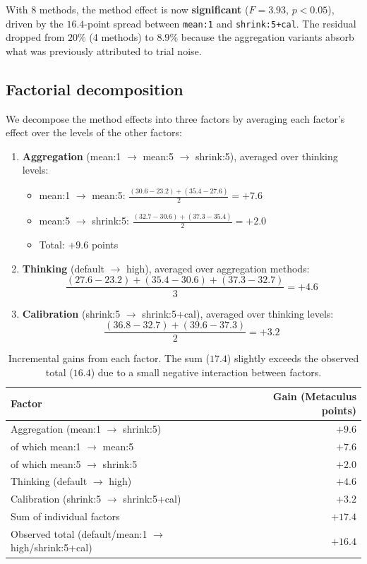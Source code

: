 \documentclass[11pt]{article}
\begin{document}
With 8 methods, the method effect is now \textbf{significant} ($F = 3.93$,
$p < 0.05$), driven by the $16.4$-point spread between \texttt{mean:1}
and \texttt{shrink:5+cal}.  The residual dropped from $20\%$ (4 methods)
to $8.9\%$ because the aggregation variants absorb what was previously
attributed to trial noise.

\subsection{Factorial decomposition}

We decompose the method effects into three factors by averaging each
factor's effect over the levels of the other factors:

\begin{enumerate}
  \item \textbf{Aggregation} (mean:1 $\to$ mean:5 $\to$ shrink:5),
    averaged over thinking levels:
    \begin{itemize}
      \item mean:1 $\to$ mean:5:
        $\frac{(30.6 - 23.2) + (35.4 - 27.6)}{2} = +7.6$
      \item mean:5 $\to$ shrink:5:
        $\frac{(32.7 - 30.6) + (37.3 - 35.4)}{2} = +2.0$
      \item Total: $+9.6$ points
    \end{itemize}
  \item \textbf{Thinking} (default $\to$ high),
    averaged over aggregation methods:
    \[
      \frac{(27.6 - 23.2) + (35.4 - 30.6) + (37.3 - 32.7)}{3} = +4.6
    \]
  \item \textbf{Calibration} (shrink:5 $\to$ shrink:5+cal),
    averaged over thinking levels:
    \[
      \frac{(36.8 - 32.7) + (39.6 - 37.3)}{2} = +3.2
    \]
\end{enumerate}

\begin{table}[h]
\centering
\begin{tabular}{lr}
\toprule
Factor & Gain (Metaculus points) \\
\midrule
Aggregation (mean:1 $\to$ shrink:5) & $+9.6$ \\
\quad of which mean:1 $\to$ mean:5 & $+7.6$ \\
\quad of which mean:5 $\to$ shrink:5 & $+2.0$ \\
Thinking (default $\to$ high) & $+4.6$ \\
Calibration (shrink:5 $\to$ shrink:5+cal) & $+3.2$ \\
\midrule
Sum of individual factors & $+17.4$ \\
Observed total (default/mean:1 $\to$ high/shrink:5+cal) & $+16.4$ \\
\bottomrule
\end{tabular}
\caption{Incremental gains from each factor.  The sum ($17.4$) slightly
  exceeds the observed total ($16.4$) due to a small negative interaction
  between factors.}
\label{tab:factorial}
\end{table}
\end{document}
